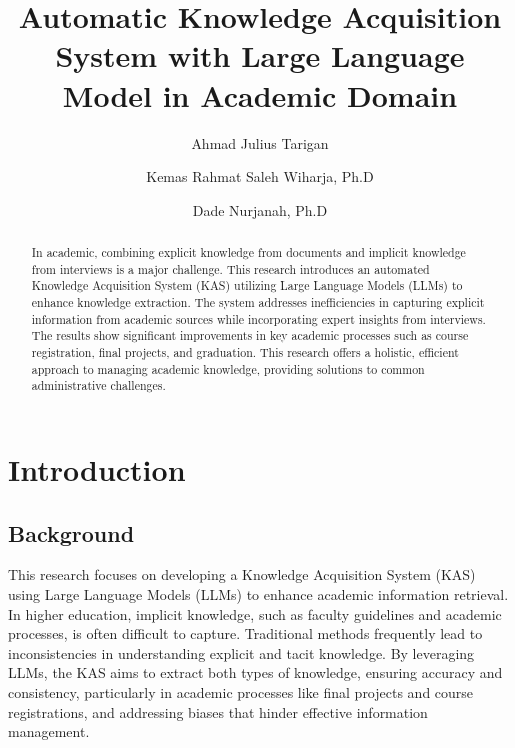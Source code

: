 \documentclass[runningheads]{llncs}
\begin{document}
%
\title{Automatic Knowledge Acquisition System with Large Language Model in Academic Domain}
%
%
\author{Ahmad Julius Tarigan \and
Kemas Rahmat Saleh Wiharja, Ph.D \and
Dade Nurjanah, Ph.D}
%
%
%
\maketitle              %
%
\begin{abstract}
In academic, combining explicit knowledge from documents and implicit knowledge from interviews is a major challenge. This research introduces an automated Knowledge Acquisition System (KAS) utilizing Large Language Models (LLMs) to enhance knowledge extraction. The system addresses inefficiencies in capturing explicit information from academic sources while incorporating expert insights from interviews. The results show significant improvements in key academic processes such as course registration, final projects, and graduation. This research offers a holistic, efficient approach to managing academic knowledge, providing solutions to common administrative challenges.

\end{abstract}
%
%
%
\section{Introduction}
\subsection{Background}
This research focuses on developing a Knowledge Acquisition System (KAS) using Large Language Models (LLMs) to enhance academic information retrieval. In higher education, implicit knowledge, such as faculty guidelines and academic processes, is often difficult to capture. Traditional methods frequently lead to inconsistencies in understanding explicit and tacit knowledge. By leveraging LLMs, the KAS aims to extract both types of knowledge, ensuring accuracy and consistency, particularly in academic processes like final projects and course registrations, and addressing biases that hinder effective information management.
\end{document}
